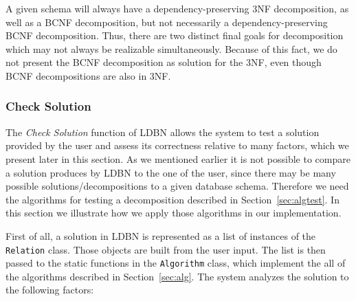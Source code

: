 A given schema will always have a dependency-preserving 3NF
decomposition, as well as a BCNF decomposition, but not necessarily a
dependency-preserving BCNF decomposition. Thus, there are two
distinct final goals for decomposition which may not always be
realizable simultaneously. Because of this fact, we do not present the BCNF decomposition as solution
for the 3NF, even though BCNF decompositions are also in 3NF.

\subsubsection{Check Solution}  
The \textit{Check Solution} function of LDBN allows the system to test a solution 
provided by the user and assess its correctness relative to many factors, which
we present later in this section. As we mentioned earlier it is not possible
to compare a solution produces by LDBN to the one of the user, since there may be many
possible solutions/decompositions to a given database schema. Therefore we need the
algorithms for testing a decomposition described in Section~\ref{sec:algtest}. In this section
we illustrate how we apply those algorithms in our implementation. 

First of all, a solution in LDBN is represented as a list of instances of the
\verb=Relation= class. Those objects are built from the user input. The list is then
passed to the static functions in the \verb=Algorithm= class, which 
implement the all of the algorithms described in Section~\ref{sec:alg}. 
The system analyzes the solution to the following factors:

